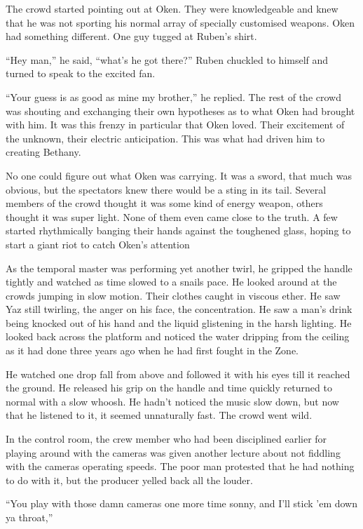 The crowd started pointing out at Oken. They were knowledgeable and knew that he was not sporting his normal array of specially customised weapons. Oken had something different. One guy tugged at Ruben's shirt.

``Hey man,'' he said, ``what's he got there?'' Ruben chuckled to himself and turned to speak to the excited fan.

``Your guess is as good as mine my brother,'' he replied. The rest of the crowd was shouting and exchanging their own hypotheses as to what Oken had brought with him. It was this frenzy in particular that Oken loved. Their excitement of the unknown, their electric anticipation. This was what had driven him to creating Bethany.

No one could figure out what Oken was carrying. It was a sword, that much was obvious, but the spectators knew there would be a sting in its tail. Several members of the crowd thought it was some kind of energy weapon, others thought it was super light. None of them even came close to the truth. A few started rhythmically banging their hands against the toughened glass, hoping to start a giant riot to catch Oken's attention

As the temporal master was performing yet another twirl, he gripped the handle tightly and watched as time slowed to a snails pace. He looked around at the crowds jumping in slow motion. Their clothes caught in viscous ether. He saw Yaz still twirling, the anger on his face, the concentration. He saw a man's drink being knocked out of his hand and the liquid glistening in the harsh lighting. He looked back across the platform and noticed the water dripping from the ceiling as it had done three years ago when he had first fought in the Zone.

He watched one drop fall from above and followed it with his eyes till it reached the ground. He released his grip on the handle and time quickly returned to normal with a slow whoosh. He hadn't noticed the music slow down, but now that he listened to it, it seemed unnaturally fast. The crowd went wild.

In the control room, the crew member who had been disciplined earlier for playing around with the cameras was given another lecture about not fiddling with the cameras operating speeds. The poor man protested that he had nothing to do with it, but the producer yelled back all the louder.

``You play with those damn cameras one more time sonny, and I'll stick 'em down ya throat,''

